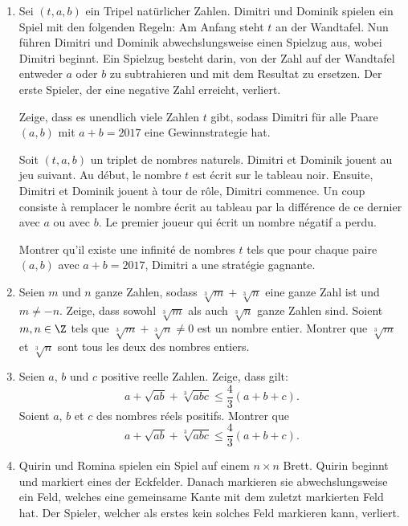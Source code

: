 \documentclass[language=german,style=exam]{smo}
\title{\translation{SMO - Weisse Prüfung}{OSM - Test blanc}{???}}
\begin{document}
\begin{enumerate}[label=\textbf{\arabic*.}]

\bigskip\bigskip

\item\translation%
{Sei $(t,a,b)$ ein Tripel natürlicher Zahlen. Dimitri und Dominik spielen ein Spiel mit den folgenden Regeln: Am Anfang steht $t$ an der Wandtafel. Nun führen Dimitri und Dominik abwechslungsweise einen Spielzug aus, wobei Dimitri beginnt. Ein Spielzug besteht darin, von der Zahl auf der Wandtafel entweder $a$ oder $b$ zu subtrahieren und mit dem Resultat zu ersetzen. Der erste Spieler, der eine negative Zahl erreicht, verliert.

Zeige, dass es unendlich viele Zahlen $t$ gibt, sodass Dimitri für alle Paare $(a,b)$ mit $a+b=2017$ eine Gewinnstrategie hat.}
{Soit $(t, a, b)$ un triplet de nombres naturels. Dimitri et Dominik jouent au jeu suivant. Au début, le nombre $t$ est écrit sur le tableau noir. Ensuite, Dimitri et Dominik jouent à tour de rôle, Dimitri commence. Un coup consiste à remplacer le nombre écrit au tableau par la différence de ce dernier avec $a$ ou avec $b$. Le premier joueur qui écrit un nombre négatif a perdu.

Montrer qu'il existe une infinité de nombres $t$ tels que pour chaque paire $(a, b)$ avec $a+b = 2017$, Dimitri a une stratégie gagnante.}
{}

\bigskip\bigskip

\item\translation%
{Seien $m$ und $n$ ganze Zahlen, sodass $\sqrt[3]{m}+\sqrt[3]{n}$ eine ganze Zahl ist und $m \neq -n$. Zeige, dass sowohl $\sqrt[3]{m}$ als auch $\sqrt[3]{n}$ ganze Zahlen sind.}
{Soient $m,n\in \Z$ tels que $\sqrt[3]{m}+\sqrt[3]{n} \neq 0$ est un nombre entier. Montrer que $\sqrt[3]{m}$ et $\sqrt[3]{n}$ sont tous les deux des nombres entiers.}
{}

\bigskip\bigskip

\item\translation%
{Seien $a$, $b$ und $c$ positive reelle Zahlen. Zeige, dass gilt:
\[
a + \sqrt{ab} + \sqrt[3]{abc} \leq \frac{4}{3}(a+b+c).
\]}
{Soient $a$, $b$ et $c$ des nombres réels positifs. Montrer que
\[
a + \sqrt{ab} + \sqrt[3]{abc} \leq \frac{4}{3}(a+b+c).
\]}
{}

\bigskip\bigskip

\item\translation%
{Quirin und Romina spielen ein Spiel auf einem $n\times n$ Brett. Quirin beginnt und markiert eines der Eckfelder. Danach markieren sie abwechslungsweise ein Feld, welches eine gemeinsame Kante mit dem zuletzt markierten Feld hat. Der Spieler, welcher als erstes kein solches Feld markieren kann, verliert.

}
\end{enumerate}
\end{document}
